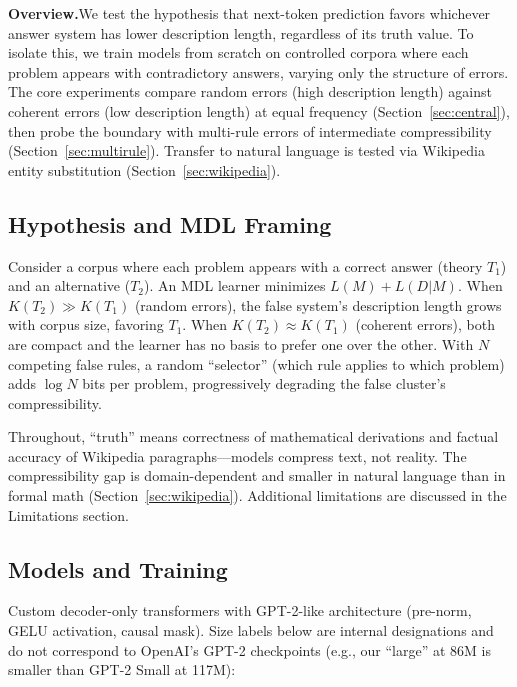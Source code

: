 \documentclass{article}
\begin{document}
\textbf{Overview.}\quad We test the hypothesis that next-token prediction favors whichever answer system has lower description length, regardless of its truth value. To isolate this, we train models from scratch on controlled corpora where each problem appears with contradictory answers, varying only the structure of errors. The core experiments compare random errors (high description length) against coherent errors (low description length) at equal frequency (Section~\ref{sec:central}), then probe the boundary with multi-rule errors of intermediate compressibility (Section~\ref{sec:multirule}). Transfer to natural language is tested via Wikipedia entity substitution (Section~\ref{sec:wikipedia}).

\subsection{Hypothesis and MDL Framing}
\label{sec:mdl}

Consider a corpus where each problem appears with a correct answer (theory $T_1$) and an alternative ($T_2$). An MDL learner \citep{rissanen1978modeling,grunwald2007minimum} minimizes $L(M) + L(D|M)$. When $K(T_2) \gg K(T_1)$ (random errors), the false system's description length grows with corpus size, favoring $T_1$. When $K(T_2) \approx K(T_1)$ (coherent errors), both are compact and the learner has no basis to prefer one over the other. With $N$ competing false rules, a random ``selector'' (which rule applies to which problem) adds $\log N$ bits per problem, progressively degrading the false cluster's compressibility.

Throughout, ``truth'' means correctness of mathematical derivations and factual accuracy of Wikipedia paragraphs---models compress text, not reality. The compressibility gap is domain-dependent and smaller in natural language than in formal math (Section~\ref{sec:wikipedia}). Additional limitations are discussed in the Limitations section.

\subsection{Models and Training}
\label{sec:models}

Custom decoder-only transformers with GPT-2-like architecture (pre-norm, GELU activation, causal mask). Size labels below are internal designations and do not correspond to OpenAI's GPT-2 checkpoints (e.g., our ``large'' at 86M is smaller than GPT-2 Small at 117M):
\end{document}
